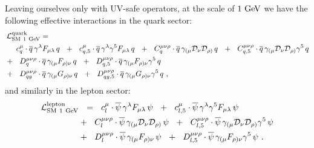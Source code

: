 \documentclass[12pt,preprintnumbers,nofootinbib]{revtex4}
\newcommand{\ov}{\overline}
\newcommand{\md}{\mathcal{D}}
\newcommand{\GeV}{{\rm GeV}}
\begin{document}
	
	Leaving ourselves only with UV-safe operators, 
	at the scale of $ 1~\GeV $ we 
	have the following effective interactions in the quark sector:
\begin{align}
\nonumber
	\mathcal{L}_{\rm SM\ 1~GeV}^{\rm quark} = \hspace{-2.0cm}&
	\\
\nonumber
	&
	\phantom{+~~}
	c_{q}^\mu \cdot
	\ov{q}\, \gamma^\lambda F_{\mu\lambda}\, q 
	~~+~~
	c_{q,5}^\mu \cdot
	\ov{q}\, \gamma^\lambda \gamma^5 F_{\mu\lambda}\, q 
	~~+~~
	C_q^{\mu\nu\rho} \cdot
	\ov{q}\, \gamma_{(\mu} \md_\nu \md_{\rho)}\, q
	~~+~~
	C_{q,5}^{\mu\nu\rho} \cdot
	\ov{q}\, \gamma_{(\mu} \md_\nu \md_{\rho)}\gamma^5\, q
	\\
\label{SM_quark_1GeV}
	&
	+~~
	D_{q}^{\mu\nu\rho} \cdot
	\ov{q}\, \gamma_{(\mu} F_{\rho)\nu}\, q
	~~+~~
	D_{q,5}^{\mu\nu\rho} \cdot
	\ov{q}\, \gamma_{(\mu} F_{\rho)\nu}\gamma^5\, q
	\\
\nonumber
	&
	+~~
	D_{qg}^{\mu\nu\rho} \cdot
	\ov{q}\, \gamma_{(\mu} G_{\rho)\nu}\, q
	~~+~~
	D_{qg,5}^{\mu\nu\rho} \cdot
	\ov{q}\, \gamma_{(\mu} G_{\rho)\nu}\gamma^5\, q
	~,
\end{align}
	and similarly in the lepton sector:
\begin{align}
\nonumber
	\mathcal{L}_{\rm SM\ 1~GeV}^{\rm lepton} & ~~=~~ %
	c_l^\mu \cdot
	\ov{\psi}\, \gamma^{\lambda} F_{\mu\lambda}\, \psi
	~~+~~
	c_{l,5}^\mu \cdot
	\ov{\psi}\, \gamma^{\lambda}\gamma^5 F_{\mu\lambda}\, \psi
	\\
\label{SM_lepton_1GeV}
	&
	+~~
	C_l^{\mu\nu\rho} \cdot
	\ov{\psi}\, \gamma_{(\mu} \md_\nu \md_{\rho)}\, \psi
	~~+~~
	C_{l,5}^{\mu\nu\rho} \cdot
	\ov{\psi}\, \gamma_{(\mu} \md_\nu \md_{\rho)}\gamma^5\, \psi
	\\
\notag
	&
	+~~
	D_{l}^{\mu\nu\rho} \cdot
	\ov{\psi}\, \gamma_{(\mu} F_{\rho)\nu}\, \psi
	~~+~~
	D_{l,5}^{\mu\nu\rho} \cdot
	\ov{\psi}\, \gamma_{(\mu} F_{\rho)\nu}\gamma^5\, \psi
	~.
\end{align}
\end{document}
